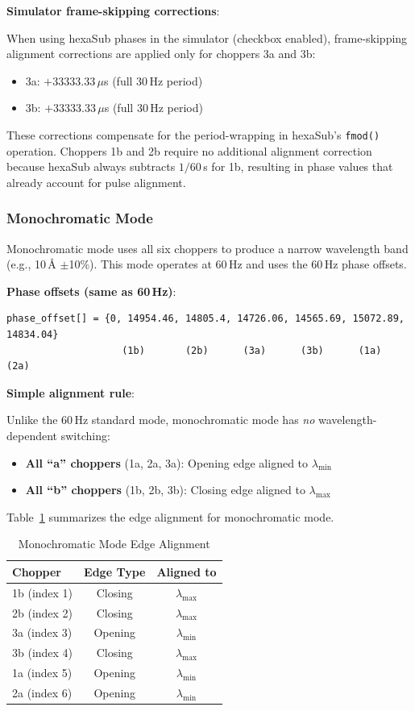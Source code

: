 \documentclass[11pt,letterpaper]{article}
\begin{document}
\textbf{Simulator frame-skipping corrections}:

When using hexaSub phases in the simulator (checkbox enabled), frame-skipping alignment 
corrections are applied only for choppers 3a and 3b:
\begin{itemize}
    \item 3a: $+33333.33$\,$\mu$s (full 30\,Hz period)
    \item 3b: $+33333.33$\,$\mu$s (full 30\,Hz period)
\end{itemize}

These corrections compensate for the period-wrapping in hexaSub's \texttt{fmod()} operation.
Choppers 1b and 2b require no additional alignment correction because hexaSub always subtracts
$1/60$\,s for 1b, resulting in phase values that already account for pulse alignment.

\subsubsection{Monochromatic Mode}

Monochromatic mode uses all six choppers to produce a narrow wavelength band (e.g., 10\,\AA{} 
$\pm$10\%). This mode operates at 60\,Hz and uses the 60\,Hz phase offsets.

\textbf{Phase offsets (same as 60\,Hz)}:
\begin{verbatim}
phase_offset[] = {0, 14954.46, 14805.4, 14726.06, 14565.69, 15072.89, 14834.04}
                    (1b)       (2b)      (3a)      (3b)      (1a)      (2a)
\end{verbatim}

\textbf{Simple alignment rule}:

Unlike the 60\,Hz standard mode, monochromatic mode has \emph{no} wavelength-dependent switching:
\begin{itemize}
    \item \textbf{All ``a'' choppers} (1a, 2a, 3a): Opening edge aligned to $\lambda_{\min}$
    \item \textbf{All ``b'' choppers} (1b, 2b, 3b): Closing edge aligned to $\lambda_{\max}$
\end{itemize}

Table~\ref{tab:mono_alignment} summarizes the edge alignment for monochromatic mode.

\begin{table}[h]
\centering
\caption{Monochromatic Mode Edge Alignment}
\label{tab:mono_alignment}
\begin{tabular}{lcc}
\toprule
Chopper & Edge Type & Aligned to \\
\midrule
1b (index 1) & Closing & $\lambda_{\max}$ \\
2b (index 2) & Closing & $\lambda_{\max}$ \\
3a (index 3) & Opening & $\lambda_{\min}$ \\
3b (index 4) & Closing & $\lambda_{\max}$ \\
1a (index 5) & Opening & $\lambda_{\min}$ \\
2a (index 6) & Opening & $\lambda_{\min}$ \\
\bottomrule
\end{tabular}
\end{table}
\end{document}
